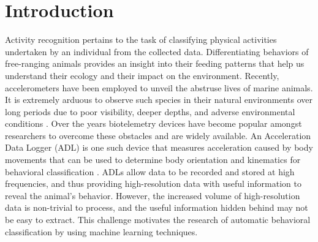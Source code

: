 \documentclass[conference]{IEEEtran}
\begin{document}
\section{Introduction}
Activity recognition pertains to the task of classifying physical activities undertaken by an individual from the collected data. Differentiating behaviors of free-ranging animals provides an insight into their feeding patterns that help us understand their ecology and their impact on the environment. Recently, accelerometers have been employed to unveil the abstruse lives of marine animals.   It is extremely arduous to observe such species in their natural environments over long periods due to poor visibility, deeper depths, and adverse environmental conditions \cite{1}. Over the years biotelemetry devices have become popular amongst researchers to overcome these obstacles and are widely available. An Acceleration Data Logger (ADL) is one such device that measures acceleration caused by body movements that can be used to determine body orientation and kinematics for behavioral classification \cite{1}. ADLs allow data to be recorded and stored at high frequencies, and thus providing high-resolution data with useful information to reveal the animal’s behavior. However, the increased   volume of high-resolution data is non-trivial to process, and the useful information hidden behind may not be easy to extract. This challenge motivates the research of automatic behavioral classification by using machine learning techniques.
\end{document}
